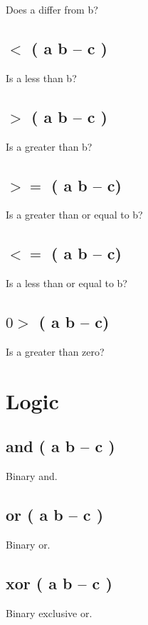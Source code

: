 Does a differ from b?

\subsection{$<$ ( a b -- c )}

Is a less than b?

\subsection{$>$ ( a b -- c )}

Is a greater than b?

\subsection{$>=$ ( a b -- c)}

Is a greater than or equal to b?

\subsection{$<=$ ( a b -- c)}

Is a less than or equal to b?

\subsection{$0>$ ( a b -- c)}

Is a greater than zero?


\section{Logic}

\subsection{and ( a b -- c )}

Binary and.

\subsection{or ( a b -- c )}

Binary or.

\subsection{xor ( a b -- c )}

Binary exclusive or.

